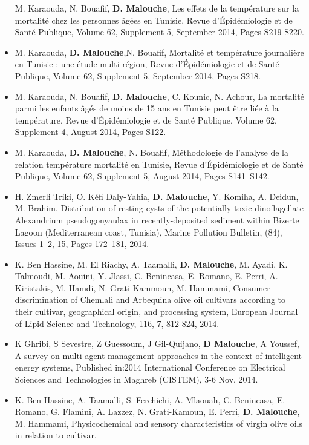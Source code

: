 \documentclass[]{article}
\begin{document}
\begin{itemize}
  M. Karaouda, N. Bouafif, \textbf{D. Malouche}, Les effets de la
  température sur la mortalité chez les personnes âgées en Tunisie,
  Revue d'Épidémiologie et de Santé Publique, Volume 62, Supplement 5,
  September 2014, Pages S219-S220.
\item
  M. Karaouda, \textbf{D. Malouche},N. Bouafif, Mortalité et température
  journalière en Tunisie : une étude multi-région, Revue d'Épidémiologie
  et de Santé Publique, Volume 62, Supplement 5, September 2014, Pages
  S218.
\item
  M. Karaouda, N. Bouafif, \textbf{D. Malouche}, C. Kounic, N. Achour,
  La mortalité parmi les enfants âgés de moins de 15 ans en Tunisie peut
  être liée à la température, Revue d'Épidémiologie et de Santé
  Publique, Volume 62, Supplement 4, August 2014, Pages S122.
\item
  M. Karaouda, \textbf{D. Malouche}, N. Bouafif, Méthodologie de
  l'analyse de la relation température mortalité en Tunisie, Revue
  d'Épidémiologie et de Santé Publique, Volume 62, Supplement 5, August
  2014, Pages S141--S142.
\item
  H. Zmerli Triki, O. Kéfi Daly-Yahia, \textbf{D. Malouche}, Y. Komiha,
  A. Deidun, M. Brahim, Distribution of resting cysts of the potentially
  toxic dinoflagellate Alexandrium pseudogonyaulax in recently-deposited
  sediment within Bizerte Lagoon (Mediterranean coast, Tunisia), Marine
  Pollution Bulletin, (84), Issues 1--2, 15, Pages 172--181, 2014.
\item
  K. Ben Hassine, M. El Riachy, A. Taamalli, \textbf{D. Malouche}, M.
  Ayadi, K. Talmoudi, M. Aouini, Y. Jlassi, C. Benincasa, E. Romano, E.
  Perri, A. Kiristakis, M. Hamdi, N. Grati Kammoun, M. Hammami, Consumer
  discrimination of Chemlali and Arbequina olive oil cultivars according
  to their cultivar, geographical origin, and processing system,
  European Journal of Lipid Science and Technology, 116, 7, 812-824,
  2014.
\item
  K Ghribi, S Sevestre, Z Guessoum, J Gil-Quijano, \textbf{D Malouche},
  A Youssef, A survey on multi-agent management approaches in the
  context of intelligent energy systems, Published in:2014 International
  Conference on Electrical Sciences and Technologies in Maghreb
  (CISTEM), 3-6 Nov. 2014.
\item
  K. Ben-Hassine, A. Taamalli, S. Ferchichi, A. Mlaouah, C. Benincasa,
  E. Romano, G. Flamini, A. Lazzez, N. Grati-Kamoun, E. Perri,
  \textbf{D. Malouche}, M. Hammami, Physicochemical and sensory
  characteristics of virgin olive oils in relation to cultivar,

\end{itemize}
\end{document}
